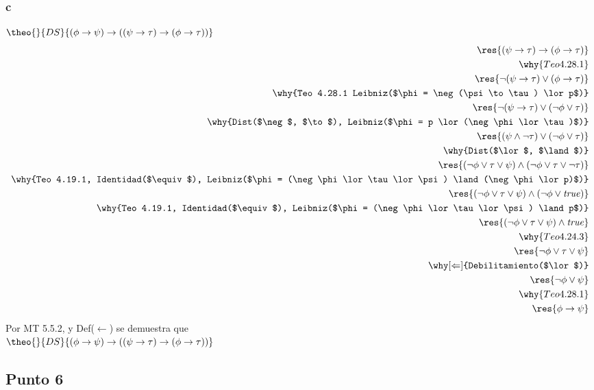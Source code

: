 \documentclass[twoside]{article}
\begin{document}
\subsubsection{c}
\begin{logicenv}{$\theo{}{DS}{(\phi \to \psi) \to ((\psi \to \tau) \to (\phi \to \tau))}$}
    \begin{align*}
            \res{(\psi \to \tau) \to (\phi \to \tau)}\\
        \why{Teo 4.28.1}\\
            \res{\neg(\psi \to \tau) \lor (\phi \to \tau)}\\
        \why{Teo 4.28.1 Leibniz($\phi = \neg(\psi \to \tau) \lor p$)}\\
            \res{\neg(\psi \to \tau) \lor (\neg\phi \lor \tau)}\\
        \why{Dist($\neg$, $\to$), Leibniz($\phi = p \lor (\neg\phi \lor \tau)$)}\\
            \res{(\psi \land \neg\tau) \lor (\neg\phi \lor \tau)}\\
        \why{Dist($\lor$, $\land$)}\\
            \res{(\neg\phi \lor \tau \lor \psi) \land (\neg\phi \lor \tau \lor \neg\tau)}\\
        \why{Teo 4.19.1, Identidad($\equiv$), Leibniz($\phi = (\neg\phi \lor \tau \lor \psi) \land (\neg\phi \lor p)$)}\\
            \res{(\neg\phi \lor \tau \lor \psi) \land (\neg\phi \lor \text{\textit{true}})}\\
        \why{Teo 4.19.1, Identidad($\equiv$), Leibniz($\phi = (\neg\phi \lor \tau \lor \psi) \land p$)}\\
            \res{(\neg\phi \lor \tau \lor \psi) \land \text{\textit{true}}}\\
        \why{Teo 4.24.3}\\
            \res{\neg\phi \lor \tau \lor \psi}\\
        \why[\Leftarrow]{Debilitamiento($\lor$)}\\
            \res{\neg\phi \lor \psi}\\
        \why{Teo 4.28.1}\\
            \res{\phi \to \psi}
    \end{align*}
    Por MT 5.5.2, y Def($\gets$) se demuestra que\\
    $\theo{}{DS}{(\phi \to \psi) \to ((\psi \to \tau) \to (\phi \to \tau))}$
\end{logicenv}


\subsection{Punto 6}
\end{document}
